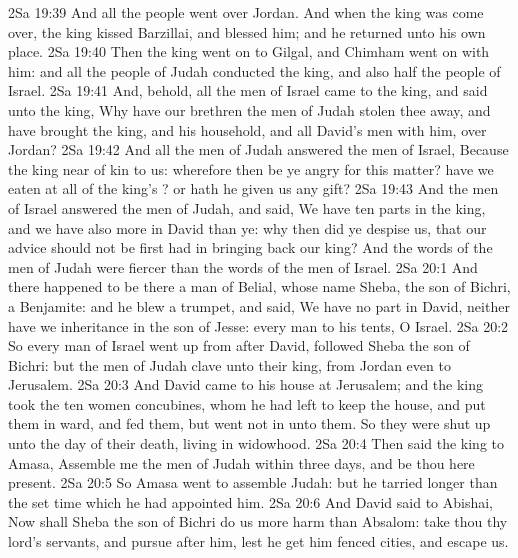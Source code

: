 \vs 2Sa 19:39 And all the people went over Jordan. And when the king was come over, the king kissed Barzillai, and blessed him; and he returned unto his own place.
\vs 2Sa 19:40 Then the king went on to Gilgal, and Chimham went on with him: and all the people of Judah conducted the king, and also half the people of Israel.
\vs 2Sa 19:41 And, behold, all the men of Israel came to the king, and said unto the king, Why have our brethren the men of Judah stolen thee away, and have brought the king, and his household, and all David's men with him, over Jordan?
\vs 2Sa 19:42 And all the men of Judah answered the men of Israel, Because the king  near of kin to us: wherefore then be ye angry for this matter? have we eaten at all of the king's ? or hath he given us any gift?
\vs 2Sa 19:43 And the men of Israel answered the men of Judah, and said, We have ten parts in the king, and we have also more  in David than ye: why then did ye despise us, that our advice should not be first had in bringing back our king? And the words of the men of Judah were fiercer than the words of the men of Israel.
\vs 2Sa 20:1 And there happened to be there a man of Belial, whose name  Sheba, the son of Bichri, a Benjamite: and he blew a trumpet, and said, We have no part in David, neither have we inheritance in the son of Jesse: every man to his tents, O Israel.
\vs 2Sa 20:2 So every man of Israel went up from after David,  followed Sheba the son of Bichri: but the men of Judah clave unto their king, from Jordan even to Jerusalem.
\vs 2Sa 20:3 And David came to his house at Jerusalem; and the king took the ten women  concubines, whom he had left to keep the house, and put them in ward, and fed them, but went not in unto them. So they were shut up unto the day of their death, living in widowhood.
\vs 2Sa 20:4 Then said the king to Amasa, Assemble me the men of Judah within three days, and be thou here present.
\vs 2Sa 20:5 So Amasa went to assemble  Judah: but he tarried longer than the set time which he had appointed him.
\vs 2Sa 20:6 And David said to Abishai, Now shall Sheba the son of Bichri do us more harm than  Absalom: take thou thy lord's servants, and pursue after him, lest he get him fenced cities, and escape us.
